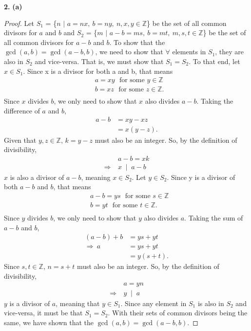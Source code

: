 \documentclass[12pt, letterpaper]{article}
\begin{document}
\textbf{2.} \textbf{(a)}  \\

\begin{proof}
    Let $S_{1}$ = \{$n$ $\mid$ $a = nx, \ b = ny, \ n,x,y \in \mathbb{Z}$\} be the set of all common divisors for $a$ and $b$ and $S_{2}$ = \{$m$ $\mid$ $a - b = ms, \ b = mt, \ m,s,t \in \mathbb{Z}$\} be the set of all common divisors for $a-b$ and $b$. To show that the $\gcd(a,b) = \gcd(a-b, b)$, we need to show that $\forall$ elements in $S_{1}$, they are also in $S_{2}$ and vice-versa. That is, we must show that $S_{1} = S_{2}$. To that end, let $x \in S_{1}.$ Since x is a divisor for both a and b, that means 
    \begin{align*}
        &a = xy \ \ \  \text{for some $y \in \mathbb{Z}$} \\
        &b = xz \ \ \  \text{for some $z \in \mathbb{Z}$}. \\
    \end{align*}
    Since $x$ divides $b$, we only need to show that $x$ also divides $a-b$. Taking the difference of $a$ and $b$,
    \begin{align*}
        a - b &= xy - xz \\
        &=x(y-z).
    \end{align*}
    Given that $y,z \in \mathbb{Z}$, $k = y-z$ must also be an integer. So, by the definition of divisibility, 
    \begin{align*}
        &a-b = xk \\
        \Rightarrow \ &x \; \mid \; a - b
    \end{align*}
    $x$ is also a divisor of $a-b$, meaning $x \in S_{2}$. Let $y \in S_{2}$. Since y is a divisor of both $a-b$ and $b$, that means
    \begin{align*}
         &a - b = ys \ \ \ \text{for some $s \in \mathbb{Z}$} \\
        &b = yt \ \ \  \text{for some $t \in \mathbb{Z}$}. \\
    \end{align*}
    Since $y$ divides $b$, we only need to show that $y$ also divides $a$. Taking the sum of $a-b$ and $b$,
    \begin{align*}
        (a-b) + b &= ys + yt \\
        \Rightarrow \ a &= ys + yt \\
        &=y(s + t).
    \end{align*}
    Since $s,t \in \mathbb{Z}$, $n = s + t$ must also be an integer. So, by the definition of divisibility,
    \begin{align*}
        &a = yn \\
        \Rightarrow \ &y \; \mid \; a
    \end{align*}
    $y$ is a divisor of $a$, meaning that $y \in S_{1}$. Since any element in $S_{1}$ is also in $S_{2}$ and vice-versa, it must be that $S_{1} = S_{2}$. With their sets of common divisors being the same, we have shown that the $\gcd(a,b) = \gcd(a-b, b)$.
\end{proof}
\end{document}
